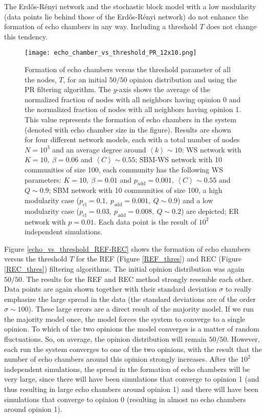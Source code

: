 \documentclass[11 pt , letterpaper , twoside , openright]{book}
\begin{document}
The Erd\H{o}s-R\'{e}nyi network and the stochastic block model with a low modularity (data points lie behind those of the Erd\H{o}s-R\'{e}nyi network) do not enhance the formation of echo chambers in any way. Including a threshold $T$ does not change this tendency. %
\newpage
\begin{figure}[H]
	\texttt{[image: echo\_chamber\_vs\_threshold\_PR\_12x10.png]}
	\captionsetup{format=plain}
	\caption[Formation of echo chambers versus the threshold parameter of all the nodes, $T$, for the PR filtering algorithm and an initial $50/50$ opinion distribution.]{Formation of echo chambers versus the threshold parameter of all the nodes, $T$, for an initial $50/50$ opinion distribution and using the PR filtering algorithm. The $y$-axis shows the average of the normalized fraction of nodes with all neighbors having opinion 0 and the normalized fraction of nodes with all neighbors having opinion 1. This value represents the formation of echo chambers in the system (denoted with echo chamber size in the figure). Results are shown for four different network models, each with a total number of nodes $N=10^3$ and an average degree around $\left<k\right> \sim 10$: WS network with $K =10,\ \beta = 0.06$ and $\left<C\right> \sim 0.55$; SBM-WS network with 10 communities of size 100, each community has the following WS parameters: $K = 10,\ \beta = 0.01$ and $p_{\text{add}} = 0.001$, $\left<C\right> \sim 0.55$ and $Q \sim 0.9$; SBM network with 10 communities of size 100, a high modularity case ($p_{\text{cl}} = 0.1,\ p_{\text{add}} = 0.001,\ Q \sim 0.9$) and a low modularity case ($p_{\text{cl}} = 0.03,\ p_{\text{add}} = 0.008,\ Q \sim 0.2$) are depicted; ER network with $p= 0.01$. Each data point is the result of $10^2$ independent simulations.}
\label{echo_vs_threshold_PR}
\end{figure}
\noindent
Figure \ref{echo_vs_threshold_REF-REC} shows the formation of echo chambers versus the threshold $T$ for the REF (Figure \ref{REF_thres}) and REC (Figure \ref{REC_thres}) filtering algorithms. The initial opinion distribution was again $50/50$. The results for the REF and REC method strongly resemble each other. Data points are again shown together with their standard deviation $\sigma$ to really emphasize the large spread in the data (the standard deviations are of the order $\sigma \sim 100$). These large errors are a direct result of the majority model. If we run the majority model once, the model forces the system to converge to a single opinion. To which of the two opinions the model converges is a matter of random fluctuations. So, on average, the opinion distribution will remain $50/50$. However, each run the system converges to one of the two opinions, with the result that the number of echo chambers around this opinion strongly increases. After the $10^2$ independent simulations, the spread in the formation of echo chambers will be very large, since there will have been simulations that converge to opinion 1 (and thus resulting in large echo chambers around opinion 1) and there will have been simulations that converge to opinion 0 (resulting in almost no echo chambers around opinion 1).\\
\end{document}

